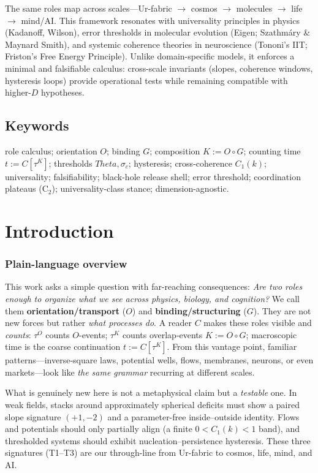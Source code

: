 \documentclass[12pt,a4paper,oneside]{scrreprt}
\def\Theta{Theta}%
\begin{document}
The same roles map across scales—Ur-fabric $\rightarrow$ cosmos $\rightarrow$ 
molecules $\rightarrow$ life $\rightarrow$ mind/AI. This framework resonates with 
universality principles in physics (Kadanoff, Wilson), error thresholds in molecular 
evolution (Eigen; Szathmáry \& Maynard Smith), and systemic coherence theories 
in neuroscience (Tononi’s IIT; Friston’s Free Energy Principle). Unlike 
domain-specific models, it enforces a minimal and falsifiable calculus: 
cross-scale invariants (slopes, coherence windows, hysteresis loops) provide 
operational tests while remaining compatible with higher-$D$ hypotheses.

\chapter*{Keywords}
role calculus; orientation $O$; binding $G$; composition $K{:=}O\!\circ G$; 
counting time $t{:=}C[\tau^K]$; thresholds $\Theta,\sigma_c$; hysteresis; 
cross-coherence $C_1(k)$; universality; falsifiability; black-hole release shell; 
error threshold; coordination plateaus (C$_2$); universality-class stance; 
dimension-agnostic.

\tableofcontents
\listoffigures
\listoftables

\clearpage
{}  

\part{Introduction}

\section*{Plain-language overview}
This work asks a simple question with far-reaching consequences: 
\emph{Are two roles enough to organize what we see across physics, biology, and cognition?} 
We call them \textbf{orientation/transport} ($O$) and \textbf{binding/structuring} ($G$). 
They are not new forces but rather \emph{what processes do}. 
A reader $C$ makes these roles visible and \emph{counts}: $\tau^O$ counts $O$-events; 
$\tau^K$ counts overlap-events $K := O \!\circ G$; macroscopic time is the coarse continuation $t := C[\tau^K]$. 
From this vantage point, familiar patterns---inverse-square laws, potential wells, flows, membranes, neurons, or even markets---look like \emph{the same grammar} recurring at different scales.

What is genuinely new here is not a metaphysical claim but a \emph{testable} one. 
In weak fields, stacks around approximately spherical deficits must show a paired slope signature $(+1,-2)$ and a parameter-free inside--outside identity. 
Flows and potentials should only partially align (a finite $0<C_1(k)<1$ band), and thresholded systems should exhibit nucleation--persistence hysteresis. 
These three signatures (T1--T3) are our through-line from Ur-fabric to cosmos, life, mind, and AI.
\end{document}

